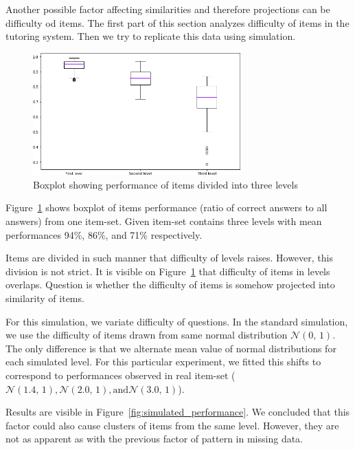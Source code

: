 \documentclass[
  printed, %
  table,   %
  nolof,     %
  nolot,     %
  color,
  final,
  nocover
]{fithesis3}
\begin{document}
Another possible factor affecting similarities and therefore projections can be difficulty od items. The first part of this section analyzes difficulty of items in the tutoring system. Then we try to replicate this data using simulation.

\begin{figure}
  \includegraphics[width=8cm]{img/items_performance_levels}
  \caption{Boxplot showing performance of items divided into three levels}
  \label{fig:item_performance_levels}
\end{figure}


Figure~\ref{fig:item_performance_levels} shows boxplot of items performance (ratio of correct answers to all answers) from one item-set. Given item-set contains three levels with mean performances 94\%, 86\%, and 71\% respectively.

Items are divided in such manner that difficulty of levels raises. However, this division is not strict. It is visible on Figure~\ref{fig:item_performance_levels} that difficulty of items in levels overlaps. Question is whether the difficulty of items is somehow projected into similarity of items.

For this simulation, we variate difficulty of questions. In the standard simulation, we use the difficulty of items drawn from same normal distribution $\mathcal{N}(0,\,1)$. The only difference is that we alternate mean value of normal distributions for each simulated level. For this particular experiment, we fitted this shifts to correspond to performances observed in real item-set ($\mathcal{N}(1.4,\,1), \mathcal{N}(2.0,\,1), \text{and} \mathcal{N}(3.0,\,1)$).


Results are visible in Figure~\ref{fig:simulated_performance}. We concluded that this factor could also cause clusters of items from the same level. However, they are not as apparent as with the previous factor of pattern in missing data.
\end{document}
